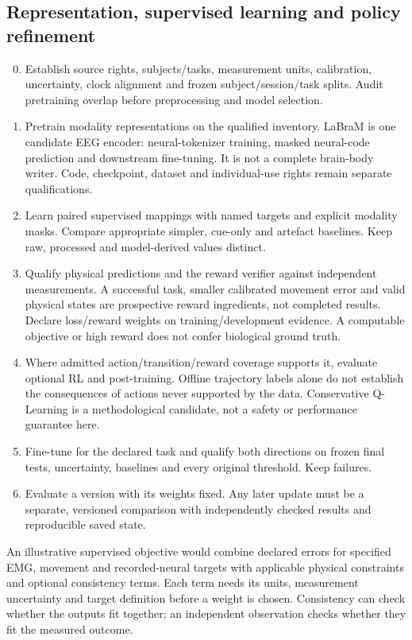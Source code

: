 \subsection{Representation, supervised learning and policy refinement}
\begin{enumerate}
\setcounter{enumi}{-1}
\item Establish source rights, subjects/tasks, measurement units, calibration,    uncertainty, clock alignment and frozen subject/session/task splits. Audit    pretraining overlap before preprocessing and model selection.
\item Pretrain modality representations on the qualified inventory. LaBraM is one    candidate EEG encoder: neural-tokenizer training, masked neural-code prediction    and downstream fine-tuning. It is not a complete brain-body writer. Code,    checkpoint, dataset and individual-use rights remain separate qualifications.
\item Learn paired supervised mappings with named targets and explicit modality    masks. Compare appropriate simpler, cue-only and artefact baselines. Keep raw,    processed and model-derived values distinct.
\item Qualify physical predictions and the reward verifier against independent    measurements. A successful task, smaller calibrated movement error and valid    physical states are prospective reward ingredients, not completed results.    Declare loss/reward weights on training/development evidence. A computable    objective or high reward does not confer biological ground truth.
\item Where admitted action/transition/reward coverage supports it, evaluate optional    RL and post-training. Offline trajectory labels alone do not establish the    consequences of actions never supported by the data. Conservative Q-Learning    is a methodological candidate, not a safety or performance guarantee here.
\item Fine-tune for the declared task and qualify both directions on frozen final    tests, uncertainty, baselines and every original threshold. Keep failures.
\item Evaluate a version with its weights fixed. Any later update must be a separate, versioned comparison with independently checked results and reproducible saved state.
\end{enumerate}

An illustrative supervised objective would combine declared errors for
specified EMG, movement and recorded-neural targets with applicable physical
constraints and optional consistency terms. Each term needs its units,
measurement uncertainty and target definition before a weight is chosen.
Consistency can check whether the outputs fit together; an independent
observation checks whether they fit the measured outcome.

